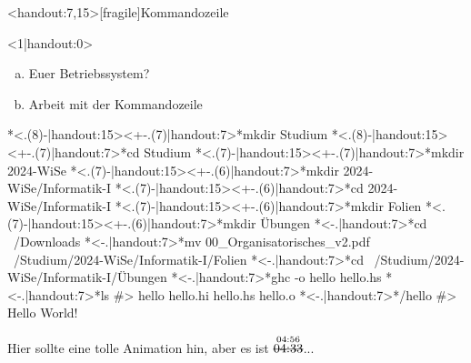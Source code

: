 \begin{frame}<handout:7,15>[fragile]{Kommandozeile}
    \begin{onlyenv}<1|handout:0> %
    \begin{exercise}
        \begin{enumerate}[a)]
            \item Euer Betriebssystem?
            \item Arbeit mit der Kommandozeile
        \end{enumerate}
    \end{exercise}
    \end{onlyenv}
    \pause[]
    \begin{solve}
        \begin{plainbash}
*\only<.(8)-|handout:15>{\vspace{-\baselineskip}}\onslide<+-.(7)|handout:7>*mkdir Studium
*\only<.(8)-|handout:15>{\vspace{-\baselineskip}}\onslide<+-.(7)|handout:7>*cd Studium
*\only<.(7)-|handout:15>{\vspace{-\baselineskip}}\onslide<+-.(7)|handout:7>*mkdir 2024-WiSe
*\only<.(7)-|handout:15>{\vspace{-\baselineskip}}\onslide<+-.(6)|handout:7>*mkdir 2024-WiSe/Informatik-I
*\only<.(7)-|handout:15>{\vspace{-\baselineskip}}\onslide<+-.(6)|handout:7>*cd 2024-WiSe/Informatik-I
*\only<.(7)-|handout:15>{\vspace{-\baselineskip}}\onslide<+-.(6)|handout:7>*mkdir Folien
*\only<.(7)-|handout:15>{\vspace{-\baselineskip}}\onslide<+-.(6)|handout:7>*mkdir Übungen
*\only<-.|handout:7>{\vspace{-\baselineskip}}*cd ~/Downloads
*\only<-.|handout:7>{\vspace{-2\baselineskip}}*mv 00_Organisatorisches_v2.pdf ~/Studium/2024-WiSe/Informatik-I/Folien
*\only<-.|handout:7>{\vspace{-\baselineskip}}*cd ~/Studium/2024-WiSe/Informatik-I/Übungen
*\only<-.|handout:7>{\vspace{-\baselineskip}}*ghc -o hello hello.hs
*\only<-.|handout:7>{\vspace{-\baselineskip}}*ls                       #> hello hello.hi hello.hs hello.o
*\only<-.|handout:7>{\vspace{-\baselineskip}}*/hello                   #> Hello World!
        \end{plainbash}
    \end{solve}
    \pause[15]
    \Tiny Hier sollte eine tolle Animation hin, aber es ist $\stackrel{\text{04:56}}{\text{\sout{04:33}}}$...
\end{frame}